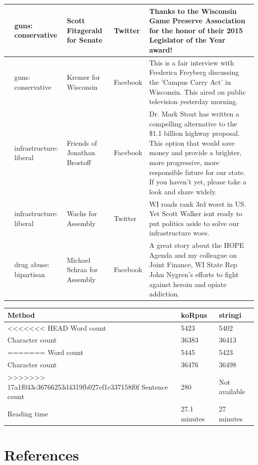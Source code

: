 \documentclass[12pt,]{article}
\begin{document}
\begin{longtable}[t]{>{\raggedright\arraybackslash}p{.65in}|>{\raggedright\arraybackslash}p{.6in}|>{\raggedright\arraybackslash}p{.7in}|>{\raggedright\arraybackslash}p{.6in}|>{\raggedright\arraybackslash}p{3in}}
\hline
8 & guns: conservative & Scott Fitzgerald for Senate & Twitter & Thanks to the Wisconsin Game Preserve Association for the honor of their 2015 Legislator of the Year award!\\
\hline
9 & guns: conservative & Kremer for Wisconsin & Facebook & This is a fair interview with Frederica Freyberg discussing the 'Campus Carry Act' in Wisconsin.  This aired on public television yesterday morning.\\
\hline
10 & infrastructure: liberal & Friends of Jonathan Brostoff & Facebook & Dr. Mark Stout has written a compelling alternative to the \$1.1 billion highway proposal. This option that would save money and provide a brighter, more progressive, more responsible future for our state. If you haven't yet, please take a look and share widely.\\
\hline
11 & infrastructure: liberal & Wachs for Assembly & Twitter & WI roads rank 3rd worst in US. Yet Scott Walker isnt ready to put politics aside to solve our infrastructure woes.\\
\hline
12 & drug abuse: bipartisan & Michael Schraa for Assembly & Facebook & A great story about the HOPE Agenda and my colleague on Joint Finance, WI State Rep John Nygren's efforts to fight against heroin and opiate addiction.\\
\hline
\end{longtable}

\begin{tabular}{l|l|l}
\hline
Method & koRpus & stringi\\
\hline
<<<<<<< HEAD
Word count & 5423 & 5402\\
\hline
Character count & 36383 & 36413\\
=======
Word count & 5445 & 5423\\
\hline
Character count & 36476 & 36498\\
>>>>>>> 17a1f043c36766253d4319fb027ef1c337158f0f
\hline
Sentence count & 280 & Not available\\
\hline
Reading time & 27.1 minutes & 27 minutes\\
\hline
\end{tabular}

\hypertarget{references}{%
\section*{References}\label{references}}
\end{document}
